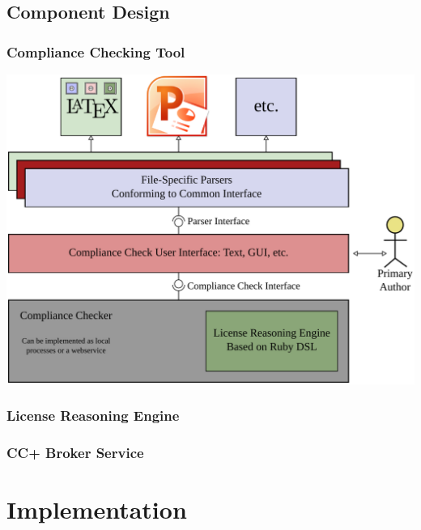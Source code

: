 \documentclass[mathserif,xcolor=dvipsnames,hyperref={bookmarks=true}]{beamer}
\begin{document}
    \subsection{Component Design}

    \begin{frame}[t]
        \frametitle{Compliance Checking Tool}
        \begin{center}
            \includegraphics[width=0.9\textheight]{compliance-checking-tool.pdf}
        \end{center}
    \end{frame}

    \begin{frame}[t]
        \frametitle{License Reasoning Engine}
    \end{frame}

    \begin{frame}[t]
        \frametitle{CC+ Broker Service}
    \end{frame}

\section{Implementation}
\begin{frame}[t]
\end{frame}
\end{document}
